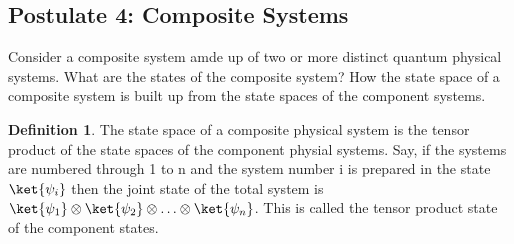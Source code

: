 \documentclass[12pt, oneside]{book}
\theoremstyle{definition}
\newtheorem{definition}{Definition}[section]
\theoremstyle{definition}
\theoremstyle{remark}
\begin{document}
\subsection{Postulate 4: Composite Systems}
Consider a composite system amde up of two or more distinct quantum physical systems.
What are the states of the composite system? How the state space of a composite system is built up from the state spaces of the component 
systems.
\begin{definition}
    The state space of a composite physical system is the tensor product of the state spaces of the component physial systems. Say, 
    if the systems are numbered through 1 to n and the system number i is prepared in the state $\ket{\psi_i}$ then the joint
    state of the total system is $\ket{\psi_1}\otimes\ket{\psi_2}\otimes\ldots\otimes\ket{\psi_n}$. This is called the tensor product state of the component states.    
\end{definition}
\end{document}
